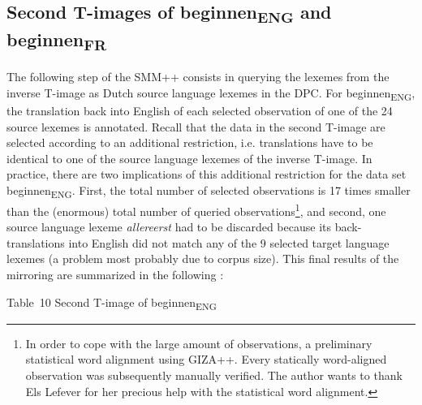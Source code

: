 \subsection{\label{sec:3.6.3}  Second T-images of beginnen\textsubscript{ENG}\textsubscript{} and beginnen\textsubscript{FR}}

The following step of the SMM++ consists in querying the lexemes from the inverse T-image as Dutch source language lexemes in the DPC. For beginnen\textsubscript{ENG}, the translation back into English of each selected observation of one of the 24 source lexemes is annotated. Recall that the data in the second T-image are selected according to an additional restriction, i.e. translations have to be identical to one of the source language lexemes of the inverse T-image. In practice, there are two implications of this additional restriction for the data set beginnen\textsubscript{ENG}. First, the total number of selected observations is 17 times smaller than the (enormous) total number of queried observations\footnote{In order to cope with the large amount of observations, a preliminary statistical word alignment using GIZA++. Every statically word-aligned observation was subsequently manually verified. The author wants to thank Els Lefever for her precious help with the statistical word alignment.}, and second, one source language lexeme \textit{allereerst} had to be discarded because its back-translations into English did not match any of the 9 selected target language lexemes (a problem most probably due to corpus size). This final results of the mirroring are summarized in the following :



Table~10  Second T-image of beginnen\textsubscript{ENG}


